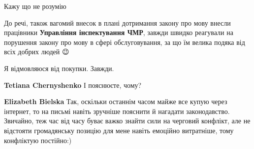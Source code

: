 \begin{itemize}
 
Кажу що не розумію

 

До речі, також вагомий внесок в плані дотримання закону про мову внесли
працівники \textbf{Управління інспектування ЧМР}, завжди швидко реагували на порушення
закону про мову в сфері обслуговування, за що їм велика подяка від всіх добрих
людей 😉


 
Я відмовляюся від покупки. Завжди.

\begin{itemize}
 
\textbf{Tetiana Chernyshenko} І пояснюєте, чому?

 
\textbf{Elizabeth Bielska} Так, оскільки останнім часом майже все купую через
інтернет, то на письмі навіть зручніше пояснити й нагадати законодавство.
Звичайно, теж час від часу буває важко знайти сили на черговий конфлікт, але не
відстояти громадянську позицію для мене навіть емоційно витратніше, тому
конфліктую постійно:)
\end{itemize}

 


\end{itemize}
